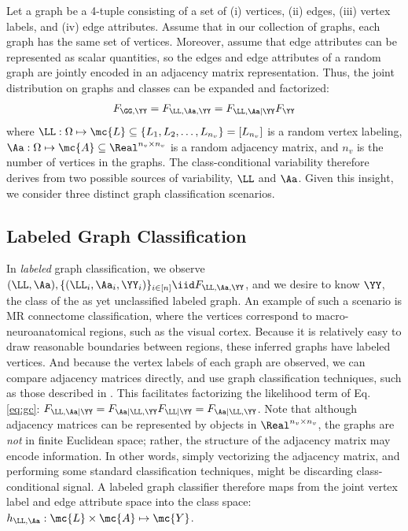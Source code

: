 \documentclass[10pt,journal,cspaper,compsoc]{IEEEtran}
\begin{document}
Let a graph be a 4-tuple consisting of a set of (i) vertices, (ii) edges, (iii) vertex labels, and (iv)  edge attributes. %
Assume that in our collection of graphs, each graph has the same set of vertices.  Moreover, assume that edge attributes can be represented as scalar quantities, so the edges and edge attributes of a random graph are jointly encoded in an adjacency matrix representation.  Thus, the joint distribution on graphs and classes can be expanded and factorized:
\begin{align} \label{eq:gc}
	F_{\GG,\YY}=F_{\LL,\Aa,\YY}=F_{\LL,\Aa | \YY} F_{\YY}
\end{align}
where $\LL: \Omega \mapsto \mc{L} \subseteq \{L_1,L_2,\ldots,L_{n_v}\}=[L_{n_v}]$ is a random vertex labeling,  $\Aa: \Omega \mapsto \mc{A} \subseteq \Real^{n_v \times n_v}$ is a random adjacency matrix, and $n_v$ is the number of vertices in the graphs.  The class-conditional variability therefore derives from two possible sources of variability, $\LL$ and $\Aa$.  Given this insight, we consider three distinct graph classification scenarios.


\subsection{Labeled Graph Classification} %
\label{sub:labeled_graph_classification}

In \emph{labeled} graph classification, we observe $(\LL,\Aa), \{(\LL_i,\Aa_i,\YY_i)\}_{i \in [n]} \iid F_{\LL,\Aa,\YY}$, and we desire to know $\YY$, the class of the as yet unclassified labeled graph.  
An example of such a scenario is MR connectome classification, where the vertices correspond to macro-neuroanatomical regions, such as the visual cortex.   Because it is relatively easy to draw reasonable boundaries between regions, these inferred graphs have labeled vertices. And because the vertex labels of each graph are observed, we can compare adjacency matrices directly, and use graph classification techniques, such as those described in \cite{Vogelstein2011}.  This facilitates factorizing the likelihood term of Eq. \eqref{eq:gc}:  $F_{\LL,\Aa|\YY}=F_{\Aa | \LL, \YY} F_{\LL|\YY} = F_{\Aa | \LL, \YY}$.  Note that although adjacency matrices can be represented by objects in $\Real^{n_v \times n_v}$, the graphs are \emph{not} in finite Euclidean space; rather, the structure of the adjacency matrix may encode information.  In other words, simply vectorizing the adjacency matrix, and performing some standard classification techniques, might be discarding class-conditional signal.  A labeled graph classifier therefore maps from the joint vertex label and edge attribute space into the class space: $h_{\LL,\Aa}: \mc{L} \times \mc{A} \mapsto \mc{Y}$.
\end{document}
